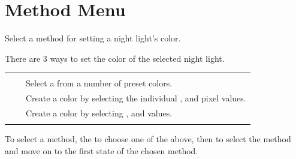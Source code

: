 
\pagebreak
\section{Method Menu} 

Select a method for setting a night light's color.

\par\medskip

There are \num{3} ways to set the color of the selected night light.

\begin{table}[H]
\centering
\begin{tabu} { X[1,c,m] | X[1,c,m] | X[3,l,m] }
  \thrule
   &  &  \\ \mrule
   &  & Select a  from a number of preset colors. \\ 
   &  & Create a color by selecting the
    individual ,  and  pixel values. \\ 
   &  & Create a color by selecting
    ,  and  values. \\
  \bhrule
\end{tabu}
\end{table}

To select a method,  the  to choose one of the above, then 
to select the method and move on to the first state of the chosen method.



